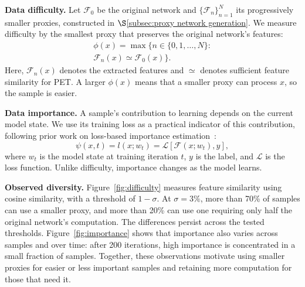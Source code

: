 \noindent \textbf{Data difficulty.}
Let $\mathcal{F}_0$ be the original network and $\{\mathcal{F}_n\}_{n=1}^{N}$ its progressively smaller proxies, constructed in $\S$\ref{subsec:proxy network generation}.
We measure difficulty by the smallest proxy that preserves the original network's features:
\begin{equation}
\begin{split}
\label{eq-difficulty_def}
\mathcal{\phi}(x) = \max\{n \in \{0,1,\ldots,N\}: \\
\mathcal{F}_n(x) \simeq \mathcal{F}_0(x)\}.
\end{split}
\end{equation}
Here, $\mathcal{F}_n(x)$ denotes the extracted features and $\simeq$ denotes sufficient feature similarity for PET.
A larger $\mathcal{\phi}(x)$ means that a smaller proxy can process $x$, so the sample is easier.

\noindent \textbf{Data importance.}
A sample's contribution to learning depends on the current model state.
We use its training loss as a practical indicator of this contribution, following prior work on loss-based importance estimation~\cite{mercury2021sensys, katharopoulos2017biased}:
\begin{equation}
\label{eq-importance_def}
\mathcal{\psi}(x,t) = l(x;w_t) = \mathcal{L}[\mathcal{F}(x;w_t),y],
\end{equation}
where $w_t$ is the model state at training iteration $t$, $y$ is the label, and $\mathcal{L}$ is the loss function.
Unlike difficulty, importance changes as the model learns.


\noindent \textbf{Observed diversity.}
Figure~\ref{fig:difficulty} measures feature similarity using cosine similarity, with a threshold of $1-\sigma$.
At $\sigma=3\%$, more than 70\% of samples can use a smaller proxy, and more than 20\% can use one requiring only half the original network's computation.
The differences persist across the tested thresholds.
Figure~\ref{fig:importance} shows that importance also varies across samples and over time: after 200 iterations, high importance is concentrated in a small fraction of samples.
Together, these observations motivate using smaller proxies for easier or less important samples and retaining more computation for those that need it.
\endgroup
